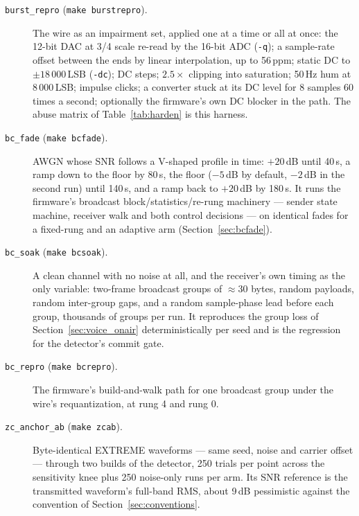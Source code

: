\begin{description}
    \item[\texttt{burst\_repro} (\texttt{make burstrepro}).]  The wire
        as an impairment set, applied one at a time or all at once:
        the 12-bit DAC at 3/4 scale re-read by the 16-bit ADC
        (\texttt{-q}); a sample-rate offset between the ends by linear
        interpolation, up to 56\,ppm; static DC to $\pm18\,000$\,LSB
        (\texttt{-dc}); DC steps; $2.5\times$ clipping into
        saturation; 50\,Hz hum at 8\,000\,LSB; impulse clicks; a
        converter stuck at its DC level for 8 samples 60 times a
        second; optionally the firmware's own DC blocker in the path.
        The abuse matrix of Table~\ref{tab:harden} is this harness.
    \item[\texttt{bc\_fade} (\texttt{make bcfade}).]  AWGN whose SNR
        follows a V-shaped profile in time: $+20$\,dB until 40\,s, a
        ramp down to the floor by 80\,s, the floor ($-5$\,dB by
        default, $-2$\,dB in the second run) until 140\,s, and a ramp
        back to $+20$\,dB by 180\,s.  It runs the firmware's broadcast
        block/statistics/re-rung machinery --- sender state machine,
        receiver walk and both control decisions --- on identical fades
        for a fixed-rung and an adaptive arm
        (Section~\ref{sec:bcfade}).
    \item[\texttt{bc\_soak} (\texttt{make bcsoak}).]  A clean channel
        with no noise at all, and the receiver's own timing as the
        only variable: two-frame broadcast groups of $\approx$30
        bytes, random payloads, random inter-group gaps, and a random
        sample-phase lead before each group, thousands of groups per
        run.  It reproduces the group loss of
        Section~\ref{sec:voice_onair} deterministically per seed and
        is the regression for the detector's commit gate.
    \item[\texttt{bc\_repro} (\texttt{make bcrepro}).]  The firmware's
        build-and-walk path for one broadcast group under the wire's
        requantization, at rung 4 and rung 0.
    \item[\texttt{zc\_anchor\_ab} (\texttt{make zcab}).]  Byte-identical
        EXTREME waveforms --- same seed, noise and carrier offset ---
        through two builds of the detector, 250 trials per point across
        the sensitivity knee plus 250 noise-only runs per arm.  Its SNR
        reference is the transmitted waveform's full-band RMS, about
        9\,dB pessimistic against the convention of
        Section~\ref{sec:conventions}.
\end{description}

